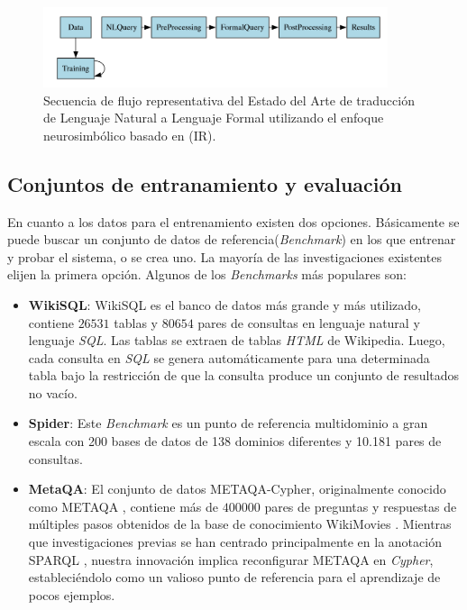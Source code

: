 \begin{figure}[!h]\label{neurosym_approach}
	\centering
	\includegraphics[width = 0.9\textwidth]{./Graphics/neurosym_approach}
	\caption{Secuencia de flujo representativa del Estado del Arte de traducción de
Lenguaje Natural a Lenguaje Formal utilizando el enfoque neurosimbólico basado en (IR).}
\end{figure}

\subsection{Conjuntos de entranamiento y evaluación} \label{neurosymbolic_approach_bechmarks}

En cuanto a los datos para el entrenamiento existen dos opciones. Básicamente se puede buscar un conjunto de datos de referencia(\textit{Benchmark}) en los que entrenar y probar el sistema, o se crea uno. La mayoría de las investigaciones existentes elijen la primera opción. Algunos de los \textit{Benchmarks} más populares son:

\begin{itemize}
	\item \textbf{WikiSQL}: WikiSQL \cite{wikisql} es el banco de datos más grande y más utilizado, contiene $26531$ tablas y $80654$ pares de consultas en lenguaje natural y lenguaje \textit{SQL}. Las tablas se extraen de tablas \textit{HTML} de Wikipedia. Luego, cada consulta en \textit{SQL} se genera automáticamente para una determinada tabla bajo la restricción de que la consulta produce un conjunto de resultados no vacío.

	\item \textbf{Spider}:	 Este \textit{Benchmark} \cite{spiderdataset} es un punto de referencia multidominio a gran escala con 200 bases de datos de 138 dominios diferentes y 10.181 pares de consultas.

	\item \textbf{MetaQA}: El conjunto de datos METAQA-Cypher, originalmente conocido como METAQA \cite{zhangetal2018}, contiene más de $400000$ pares de preguntas y respuestas de múltiples pasos obtenidos de la base de conocimiento WikiMovies \cite{milleretal2016}. Mientras que investigaciones previas se han centrado principalmente en la anotación SPARQL \cite{huangetal2021}, nuestra innovación implica reconfigurar METAQA en \textit{Cypher}, estableciéndolo como un valioso punto de referencia para el aprendizaje de pocos ejemplos.

\end{itemize}


